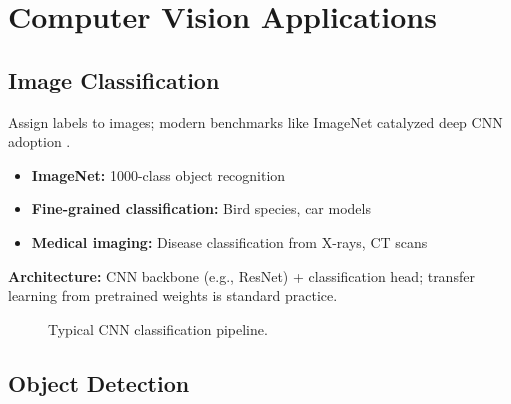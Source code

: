 
\section{Computer Vision Applications }
\label{sec:cv-applications}

\subsection{Image Classification}

Assign labels to images; modern benchmarks like ImageNet catalyzed deep CNN adoption  \textcite{Krizhevsky2012,He2016,GoodfellowEtAl2016,Prince2023}.
\begin{itemize}
    \item \textbf{ImageNet:} 1000-class object recognition
    \item \textbf{Fine-grained classification:} Bird species, car models
    \item \textbf{Medical imaging:} Disease classification from X-rays, CT scans
\end{itemize}

\textbf{Architecture:} CNN backbone (e.g., ResNet) + classification head; transfer learning from pretrained weights is standard practice.

\begin{figure}[h]
  \centering
  \caption{Typical CNN classification pipeline.}
  \label{fig:cnn-pipeline}
\end{figure}

\subsection{Object Detection}

